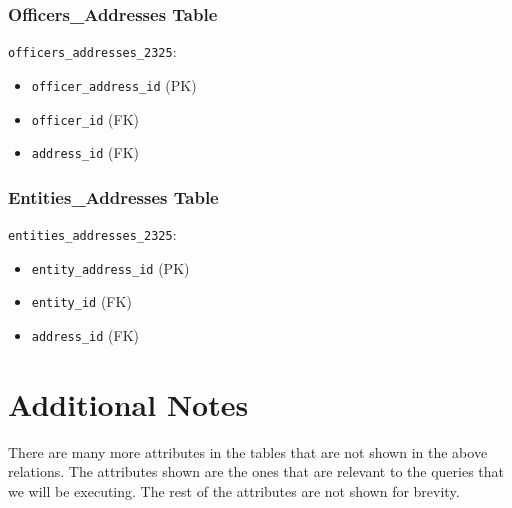 \documentclass{article}
\begin{document}
\begin{minipage}{0.5\textwidth}
    \subsubsection*{Officers\_Addresses Table}
    \texttt{officers\_addresses\_2325}:
    \begin{itemize}
        \item \texttt{officer\_address\_id} (PK)
        \item \texttt{officer\_id} (FK)
        \item \texttt{address\_id} (FK)
    \end{itemize}

    \subsubsection*{Entities\_Addresses Table}
    \texttt{entities\_addresses\_2325}:
    \begin{itemize}
        \item \texttt{entity\_address\_id} (PK)
        \item \texttt{entity\_id} (FK)
        \item \texttt{address\_id} (FK)
    \end{itemize}

\end{minipage}


\section*{\centering Additional Notes}
There are many more attributes in the tables that are not shown in the above relations. The attributes shown are the ones that are relevant to the queries that we will be executing. The rest of the attributes are not shown for brevity.
\end{document}
